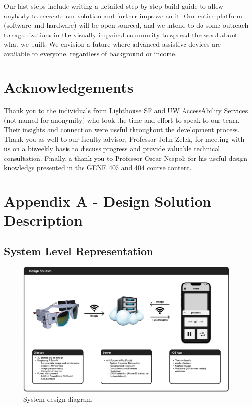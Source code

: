 \documentclass[a4paper,11pt]{article}
\begin{document}
Our last steps include writing a detailed step-by-step build guide to allow anybody to recreate our solution and further improve on it. Our entire platform (software and hardware) will be open-sourced, and we intend to do some outreach to organizations in the visually impaired community to spread the word about what we built. We envision a future where advanced assistive devices are available to everyone, regardless of background or income.

\section{Acknowledgements}
Thank you to the individuals from Lighthouse SF and UW AccessAbility Services (not named for anonymity) who took the time and effort to speak to our team. Their insights and connection were useful throughout the development process. Thank you as well to our faculty advisor, Professor John Zelek, for meeting with us on a biweekly basis to discuss progress and provide valuable technical consultation. Finally, a thank you to Professor Oscar Nespoli for his useful design knowledge presented in the GENE 403 and 404 course content.

\newpage
\section{Appendix A - Design Solution Description}
\subsection{System Level Representation}

\begin{figure}[H]
\centering
\includegraphics[scale=0.265]{img/system_diagrams/system_diagram_v4.png}
\caption{System design diagram}
\label{fig:system_diagram}
\end{figure}
\end{document}
